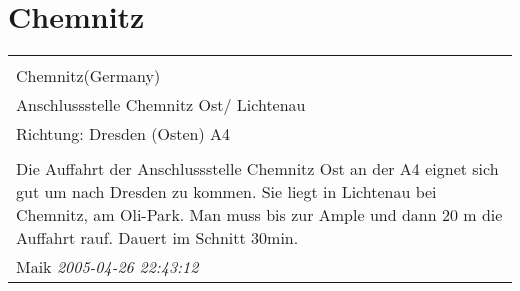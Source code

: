 \documentclass[a4paper,12pt]{article}
\begin{document}
\section{Chemnitz}
\begin{tabular}{|p{13cm}|}
\hline\\
Chemnitz(Germany)\\
Anschlussstelle Chemnitz Ost/ Lichtenau\\
Richtung: Dresden (Osten) A4 \\
\hline\\
Die Auffahrt der Anschlussstelle Chemnitz Ost an der A4 eignet sich gut um nach Dresden zu kommen.
Sie liegt in Lichtenau bei Chemnitz, am Oli-Park. Man muss bis zur Ample und dann 20 m die Auffahrt rauf.
Dauert im Schnitt 30min. \\
Maik \textit{ 2005-04-26 22:43:12 }\\\hline
\end{tabular}
\end{document}
